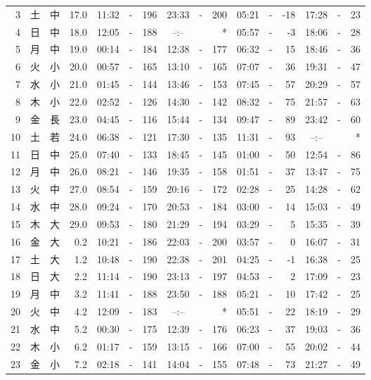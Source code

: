 \documentclass[12pt.a4j]{jsarticle}
\begin{document}
\begin{center}
\begin{table}[ht]
\begin{tabular}{|rc|cr|ccrccr|ccrccr|}
 3 & 土 & 中 & 17.0 & 11:32 &-& 196 & 23:33 &-& 200 & 05:21 &-& -18 & 17:28 &-&  23 \\
 4 & 日 & 中 & 18.0 & 12:05 &-& 188 & --:-- & &  *  & 05:57 &-&  -3 & 18:06 &-&  28 \\
 5 & 月 & 中 & 19.0 & 00:14 &-& 184 & 12:38 &-& 177 & 06:32 &-&  15 & 18:46 &-&  36 \\
 6 & 火 & 小 & 20.0 & 00:57 &-& 165 & 13:10 &-& 165 & 07:07 &-&  36 & 19:31 &-&  47 \\
 7 & 水 & 小 & 21.0 & 01:45 &-& 144 & 13:46 &-& 153 & 07:45 &-&  57 & 20:29 &-&  57 \\
 8 & 木 & 小 & 22.0 & 02:52 &-& 126 & 14:30 &-& 142 & 08:32 &-&  75 & 21:57 &-&  63 \\
 9 & 金 & 長 & 23.0 & 04:45 &-& 116 & 15:44 &-& 134 & 09:47 &-&  89 & 23:42 &-&  60 \\
10 & 土 & 若 & 24.0 & 06:38 &-& 121 & 17:30 &-& 135 & 11:31 &-&  93 & --:-- & &  *  \\
11 & 日 & 中 & 25.0 & 07:40 &-& 133 & 18:45 &-& 145 & 01:00 &-&  50 & 12:54 &-&  86 \\
12 & 月 & 中 & 26.0 & 08:21 &-& 146 & 19:35 &-& 158 & 01:51 &-&  37 & 13:47 &-&  75 \\
13 & 火 & 中 & 27.0 & 08:54 &-& 159 & 20:16 &-& 172 & 02:28 &-&  25 & 14:28 &-&  62 \\
14 & 水 & 中 & 28.0 & 09:24 &-& 170 & 20:53 &-& 184 & 03:00 &-&  14 & 15:03 &-&  49 \\
15 & 木 & 大 & 29.0 & 09:53 &-& 180 & 21:29 &-& 194 & 03:29 &-&   5 & 15:35 &-&  39 \\
16 & 金 & 大 &  0.2 & 10:21 &-& 186 & 22:03 &-& 200 & 03:57 &-&   0 & 16:07 &-&  31 \\
17 & 土 & 大 &  1.2 & 10:48 &-& 190 & 22:38 &-& 201 & 04:25 &-&  -1 & 16:38 &-&  25 \\
18 & 日 & 大 &  2.2 & 11:14 &-& 190 & 23:13 &-& 197 & 04:53 &-&   2 & 17:09 &-&  23 \\
19 & 月 & 中 &  3.2 & 11:41 &-& 188 & 23:50 &-& 188 & 05:21 &-&  10 & 17:42 &-&  25 \\
20 & 火 & 中 &  4.2 & 12:09 &-& 183 & --:-- & &  *  & 05:51 &-&  22 & 18:19 &-&  29 \\
21 & 水 & 中 &  5.2 & 00:30 &-& 175 & 12:39 &-& 176 & 06:23 &-&  37 & 19:03 &-&  36 \\
22 & 木 & 小 &  6.2 & 01:17 &-& 159 & 13:15 &-& 166 & 07:00 &-&  55 & 20:02 &-&  44 \\
23 & 金 & 小 &  7.2 & 02:18 &-& 141 & 14:04 &-& 155 & 07:48 &-&  73 & 21:27 &-&  49 \\

\end{tabular}
\end{table}
\end{center}
\end{document}
